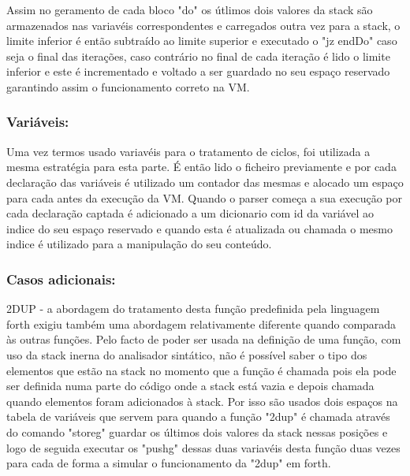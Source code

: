 \documentclass{article}
\begin{document}
    Assim no geramento de cada bloco "do" os útlimos dois valores da stack são armazenados nas variavéis correspondentes e carregados outra vez para a stack, o limite inferior é então subtraído ao limite superior e executado o "jz endDo" caso seja o final das iterações, caso contrário no final de cada iteração é lido o limite inferior e este é incrementado e voltado a ser guardado no seu espaço reservado garantindo assim o funcionamento correto na VM.  
   
    \vspace{1cm}

\subsubsection*{Variáveis:}
    \vspace{0.5cm}

    Uma vez termos usado variavéis para o tratamento de ciclos, foi utilizada a mesma estratégia para esta parte. É então lido o ficheiro previamente e por cada declaração das variáveis é utilizado um contador das mesmas e alocado um espaço para cada antes da execução da VM.
    Quando o parser começa a sua execução por cada declaração captada é adicionado a um dicionario com id da variável ao indice do seu espaço reservado e quando esta é atualizada ou chamada o mesmo indice é utilizado para a manipulação do seu conteúdo. 
   
    \vspace{1cm}

\subsubsection*{Casos adicionais:}
    \vspace{0.5cm}
    2DUP - a abordagem do tratamento desta função predefinida pela linguagem forth exigiu também uma abordagem relativamente diferente quando comparada às outras funções. Pelo facto de poder ser usada na definição de uma função, com uso da stack inerna do analisador sintático, não é possível saber o tipo dos elementos que estão na stack no momento que a função é chamada pois ela pode ser definida numa parte do código onde a stack está vazia e depois chamada quando elementos foram adicionados à stack.
    Por isso são usados dois espaços na tabela de variáveis que servem para quando a função "2dup" é chamada através do comando "storeg" guardar os últimos dois valores da stack nessas posições e logo de seguida executar os "pushg" dessas duas variavéis desta função duas vezes para cada de forma a simular o funcionamento da "2dup" em forth.
 
\end{document}
